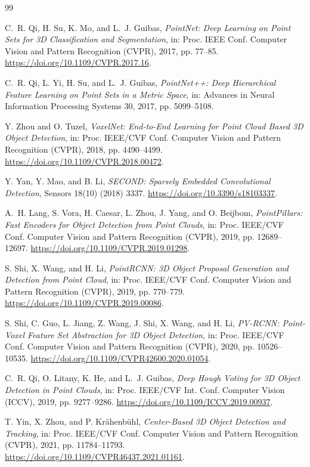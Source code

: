 \begin{thebibliography}{99}

C.~R. Qi, H. Su, K. Mo, and L.~J. Guibas,
\emph{PointNet: Deep Learning on Point Sets for 3D Classification and
Segmentation}, in: Proc. IEEE Conf. Computer Vision and Pattern Recognition
(CVPR), 2017, pp. 77--85.
\url{https://doi.org/10.1109/CVPR.2017.16}.

C.~R. Qi, L. Yi, H. Su, and L.~J. Guibas,
\emph{PointNet++: Deep Hierarchical Feature Learning on Point Sets in a Metric
Space}, in: Advances in Neural Information Processing Systems 30, 2017,
pp. 5099--5108.

Y. Zhou and O. Tuzel,
\emph{VoxelNet: End-to-End Learning for Point Cloud Based 3D Object
Detection}, in: Proc. IEEE/CVF Conf. Computer Vision and Pattern Recognition
(CVPR), 2018, pp. 4490--4499.
\url{https://doi.org/10.1109/CVPR.2018.00472}.

Y. Yan, Y. Mao, and B. Li,
\emph{SECOND: Sparsely Embedded Convolutional Detection},
Sensors 18(10) (2018) 3337.
\url{https://doi.org/10.3390/s18103337}.

A.~H. Lang, S. Vora, H. Caesar, L. Zhou, J. Yang, and O. Beijbom,
\emph{PointPillars: Fast Encoders for Object Detection from Point Clouds},
in: Proc. IEEE/CVF Conf. Computer Vision and Pattern Recognition (CVPR),
2019, pp. 12689--12697.
\url{https://doi.org/10.1109/CVPR.2019.01298}.

S. Shi, X. Wang, and H. Li,
\emph{PointRCNN: 3D Object Proposal Generation and Detection from Point
Cloud}, in: Proc. IEEE/CVF Conf. Computer Vision and Pattern Recognition
(CVPR), 2019, pp. 770--779.
\url{https://doi.org/10.1109/CVPR.2019.00086}.

S. Shi, C. Guo, L. Jiang, Z. Wang, J. Shi, X. Wang, and H. Li,
\emph{PV-RCNN: Point-Voxel Feature Set Abstraction for 3D Object Detection},
in: Proc. IEEE/CVF Conf. Computer Vision and Pattern Recognition (CVPR),
2020, pp. 10526--10535.
\url{https://doi.org/10.1109/CVPR42600.2020.01054}.

C.~R. Qi, O. Litany, K. He, and L.~J. Guibas,
\emph{Deep Hough Voting for 3D Object Detection in Point Clouds},
in: Proc. IEEE/CVF Int. Conf. Computer Vision (ICCV), 2019,
pp. 9277--9286.
\url{https://doi.org/10.1109/ICCV.2019.00937}.

T. Yin, X. Zhou, and P. Kr\"ahenb\"uhl,
\emph{Center-Based 3D Object Detection and Tracking},
in: Proc. IEEE/CVF Conf. Computer Vision and Pattern Recognition (CVPR),
2021, pp. 11784--11793.
\url{https://doi.org/10.1109/CVPR46437.2021.01161}.


\end{thebibliography}
